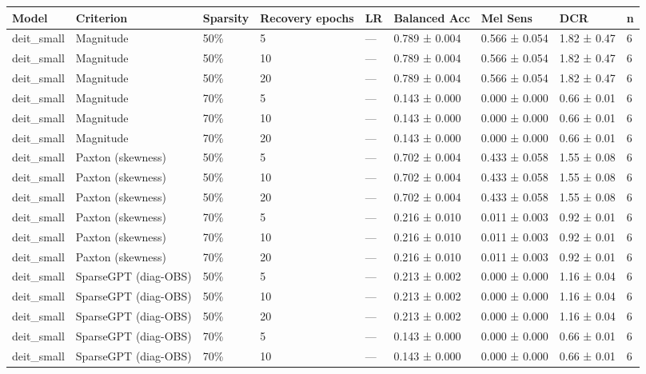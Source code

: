 \begin{table}[t]
\centering
\small
\begin{tabular}{lllllllll}
\toprule
Model & Criterion & Sparsity & Recovery epochs & LR & Balanced Acc & Mel Sens & DCR & n \\
\midrule
deit\_small & Magnitude & 50\% & 5 & — & 0.789 ± 0.004 & 0.566 ± 0.054 & 1.82 ± 0.47 & 6 \\
deit\_small & Magnitude & 50\% & 10 & — & 0.789 ± 0.004 & 0.566 ± 0.054 & 1.82 ± 0.47 & 6 \\
deit\_small & Magnitude & 50\% & 20 & — & 0.789 ± 0.004 & 0.566 ± 0.054 & 1.82 ± 0.47 & 6 \\
deit\_small & Magnitude & 70\% & 5 & — & 0.143 ± 0.000 & 0.000 ± 0.000 & 0.66 ± 0.01 & 6 \\
deit\_small & Magnitude & 70\% & 10 & — & 0.143 ± 0.000 & 0.000 ± 0.000 & 0.66 ± 0.01 & 6 \\
deit\_small & Magnitude & 70\% & 20 & — & 0.143 ± 0.000 & 0.000 ± 0.000 & 0.66 ± 0.01 & 6 \\
deit\_small & Paxton (skewness) & 50\% & 5 & — & 0.702 ± 0.004 & 0.433 ± 0.058 & 1.55 ± 0.08 & 6 \\
deit\_small & Paxton (skewness) & 50\% & 10 & — & 0.702 ± 0.004 & 0.433 ± 0.058 & 1.55 ± 0.08 & 6 \\
deit\_small & Paxton (skewness) & 50\% & 20 & — & 0.702 ± 0.004 & 0.433 ± 0.058 & 1.55 ± 0.08 & 6 \\
deit\_small & Paxton (skewness) & 70\% & 5 & — & 0.216 ± 0.010 & 0.011 ± 0.003 & 0.92 ± 0.01 & 6 \\
deit\_small & Paxton (skewness) & 70\% & 10 & — & 0.216 ± 0.010 & 0.011 ± 0.003 & 0.92 ± 0.01 & 6 \\
deit\_small & Paxton (skewness) & 70\% & 20 & — & 0.216 ± 0.010 & 0.011 ± 0.003 & 0.92 ± 0.01 & 6 \\
deit\_small & SparseGPT (diag-OBS) & 50\% & 5 & — & 0.213 ± 0.002 & 0.000 ± 0.000 & 1.16 ± 0.04 & 6 \\
deit\_small & SparseGPT (diag-OBS) & 50\% & 10 & — & 0.213 ± 0.002 & 0.000 ± 0.000 & 1.16 ± 0.04 & 6 \\
deit\_small & SparseGPT (diag-OBS) & 50\% & 20 & — & 0.213 ± 0.002 & 0.000 ± 0.000 & 1.16 ± 0.04 & 6 \\
deit\_small & SparseGPT (diag-OBS) & 70\% & 5 & — & 0.143 ± 0.000 & 0.000 ± 0.000 & 0.66 ± 0.01 & 6 \\
deit\_small & SparseGPT (diag-OBS) & 70\% & 10 & — & 0.143 ± 0.000 & 0.000 ± 0.000 & 0.66 ± 0.01 & 6 \\

\end{tabular}
\end{table}
